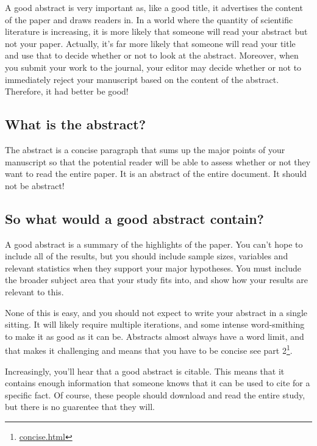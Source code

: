 \documentclass[
]{krantz}
\renewcommand{\href}[2]{#2\footnote{\url{#1}}}
\begin{document}
A good abstract is very important as, like a good title, it advertises the content of the paper and draws readers in. In a world where the quantity of scientific literature is increasing, it is more likely that someone will read your abstract but not your paper. Actually, it's far more likely that someone will read your title and use that to decide whether or not to look at the abstract. Moreover, when you submit your work to the journal, your editor may decide whether or not to immediately reject your manuscript based on the content of the abstract. Therefore, it had better be good!

\hypertarget{what-is-the-abstract}{%
\subsection{What is the abstract?}\label{what-is-the-abstract}}

The abstract is a concise paragraph that sums up the major points of your manuscript so that the potential reader will be able to assess whether or not they want to read the entire paper. It is an abstract of the entire document. It should not be abstract!

\hypertarget{so-what-would-a-good-abstract-contain}{%
\subsection{So what would a good abstract contain?}\label{so-what-would-a-good-abstract-contain}}

A good abstract is a summary of the highlights of the paper. You can't hope to include all of the results, but you should include sample sizes, variables and relevant statistics when they support your major hypotheses. You must include the broader subject area that your study fits into, and show how your results are relevant to this.

None of this is easy, and you should not expect to write your abstract in a single sitting. It will likely require multiple iterations, and some intense word-smithing to make it as good as it can be. Abstracts almost always have a word limit, and that makes it challenging and means that you have to be concise \href{concise.html}{see part 2}.

Increasingly, you'll hear that a good abstract is citable. This means that it contains enough information that someone knows that it can be used to cite for a specific fact. Of course, these people should download and read the entire study, but there is no guarentee that they will.
\end{document}
